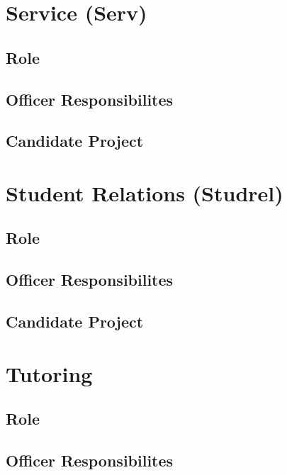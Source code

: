 \documentclass[11pt, article, oneside]{memoir}
\begin{document}
    \bigbreak

    
    \section{Service (Serv)}
    \subsection{Role}

    \subsection{Officer Responsibilites}

    \subsection{Candidate Project}


    \bigbreak

    
    \section{Student Relations (Studrel)}
    \subsection{Role}

    \subsection{Officer Responsibilites}

    \subsection{Candidate Project}


    \bigbreak

    
    \section{Tutoring}
    \subsection{Role}

    \subsection{Officer Responsibilites}
\end{document}

